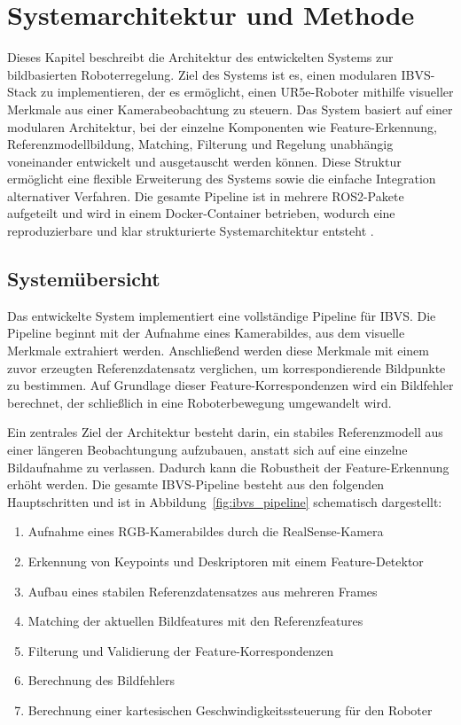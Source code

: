 \chapter{Systemarchitektur und Methode}
\label{chap:systemarchitektur_methode}

Dieses Kapitel beschreibt die Architektur des entwickelten Systems zur bildbasierten Roboterregelung. Ziel des Systems ist es, einen modularen \ac{IBVS}-Stack zu implementieren, der es ermöglicht, einen UR5e-Roboter mithilfe visueller Merkmale aus einer Kamerabeobachtung zu steuern. Das System basiert auf einer modularen Architektur, bei der einzelne Komponenten wie Feature-Erkennung, Referenzmodellbildung, Matching, Filterung und Regelung unabhängig voneinander entwickelt und ausgetauscht werden können. Diese Struktur ermöglicht eine flexible Erweiterung des Systems sowie die einfache Integration alternativer Verfahren. Die gesamte Pipeline ist in mehrere \ac{ROS2}-Pakete aufgeteilt und wird in einem Docker-Container betrieben, wodurch eine reproduzierbare und klar strukturierte Systemarchitektur entsteht \cite{ros2_nodes, ros2_topics}.

\section{Systemübersicht}
\label{sec:systemuebersicht}

Das entwickelte System implementiert eine vollständige Pipeline für \ac{IBVS}. Die Pipeline beginnt mit der Aufnahme eines Kamerabildes, aus dem visuelle Merkmale extrahiert werden. Anschließend werden diese Merkmale mit einem zuvor erzeugten Referenzdatensatz verglichen, um korrespondierende Bildpunkte zu bestimmen. Auf Grundlage dieser Feature-Korrespondenzen wird ein Bildfehler berechnet, der schließlich in eine Roboterbewegung umgewandelt wird.

Ein zentrales Ziel der Architektur besteht darin, ein stabiles Referenzmodell aus einer längeren Beobachtungung aufzubauen, anstatt sich auf eine einzelne Bildaufnahme zu verlassen. Dadurch kann die Robustheit der Feature-Erkennung erhöht werden. Die gesamte IBVS-Pipeline besteht aus den folgenden Hauptschritten und ist in Abbildung~\ref{fig:ibvs_pipeline} schematisch dargestellt:

\begin{enumerate}
	\item Aufnahme eines RGB-Kamerabildes durch die RealSense-Kamera
	\item Erkennung von Keypoints und Deskriptoren mit einem Feature-Detektor
	\item Aufbau eines stabilen Referenzdatensatzes aus mehreren Frames
	\item Matching der aktuellen Bildfeatures mit den Referenzfeatures
	\item Filterung und Validierung der Feature-Korrespondenzen
	\item Berechnung des Bildfehlers
	\item Berechnung einer kartesischen Geschwindigkeitssteuerung für den Roboter
\end{enumerate}

